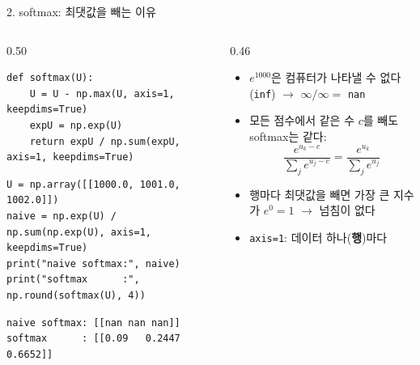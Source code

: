 \documentclass[aspectratio=169,11pt]{beamer}
\newcommand{\code}[1]{\texttt{#1}}
\begin{document}
\begin{frame}[fragile]{2. softmax: 최댓값을 빼는 이유}
\begin{columns}[T,onlytextwidth]
\begin{column}{0.50\textwidth}
\begin{lstlisting}
def softmax(U):
    U = U - np.max(U, axis=1, keepdims=True)
    expU = np.exp(U)
    return expU / np.sum(expU, axis=1, keepdims=True)
\end{lstlisting}
\begin{lstlisting}
U = np.array([[1000.0, 1001.0, 1002.0]])
naive = np.exp(U) / np.sum(np.exp(U), axis=1, keepdims=True)
print("naive softmax:", naive)
print("softmax      :", np.round(softmax(U), 4))
\end{lstlisting}
\begin{lstlisting}[style=outstyle]
naive softmax: [[nan nan nan]]
softmax      : [[0.09   0.2447 0.6652]]
\end{lstlisting}
\end{column}
\begin{column}{0.46\textwidth}
\small
\begin{itemize}
\item $e^{1000}$은 컴퓨터가 나타낼 수 없다 (\code{inf}) $\to$ $\infty/\infty=$ \code{nan}
\item 모든 점수에서 같은 수 $c$를 빼도 softmax는 같다:
\[
\frac{e^{u_k-c}}{\sum_j e^{u_j-c}}=\frac{e^{u_k}}{\sum_j e^{u_j}}
\]
\item 행마다 최댓값을 빼면 가장 큰 지수가 $e^0=1$ $\to$ 넘침이 없다
\item \code{axis=1}: 데이터 하나(\textbf{행})마다
\end{itemize}
\end{column}
\end{columns}
\end{frame}
\end{document}
